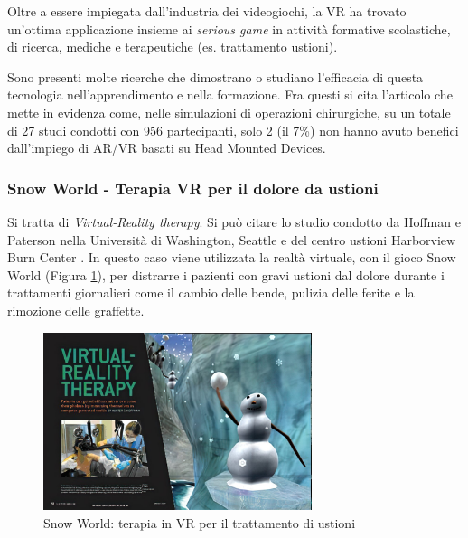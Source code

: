 Oltre a essere impiegata dall'industria dei videogiochi, la VR ha trovato un'ottima applicazione insieme ai \textit{serious game} in attività formative scolastiche, di ricerca, mediche e terapeutiche (es. trattamento ustioni).

Sono presenti molte ricerche che dimostrano o studiano l'efficacia di questa tecnologia nell'apprendimento e nella formazione. Fra questi si cita l'articolo \cite{HMDmedicalSeriousgame} che mette in evidenza come, nelle simulazioni di operazioni chirurgiche, su un totale di 27 studi condotti con 956 partecipanti, solo 2 (il 7\%) non hanno avuto benefici dall'impiego di AR/VR basati su Head Mounted Devices.

\subsubsection{Snow World - Terapia VR per il dolore da ustioni}
Si tratta di \textit{Virtual-Reality therapy}. Si può citare lo studio condotto da Hoffman e Paterson nella Università di Washington, Seattle e del centro ustioni Harborview Burn Center \cite{vrpain}. In questo caso viene utilizzata la realtà virtuale, con il gioco Snow World (Figura \ref{fig:snowworld}), per distrarre i pazienti con gravi ustioni dal dolore durante i trattamenti giornalieri come il cambio delle bende, pulizia delle ferite e la rimozione delle graffette.

\begin{figure} 
    \centering
    \includegraphics[width=0.7\textwidth]{img/snowworld.jpg}
    \caption{Snow World: terapia in VR per il trattamento di ustioni \cite{vrpain}}
    \label{fig:snowworld}
\end{figure}

